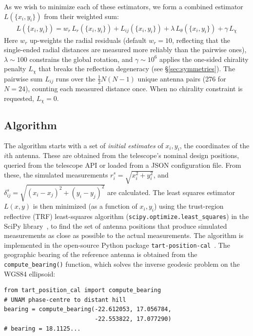 \documentclass[twocolumn, a4paper,10pt]{article}
\begin{document}
As we wish to minimize each of these estimators, we form a combined estimator $L(\{x_i, y_i\})$ from their weighted sum:
\begin{align}
	L(\{x_i, y_i\}) = w_r\, L_r(\{x_i, y_i\}) + L_{ij}(\{x_i, y_i\}) + \lambda\, L_\theta(\{x_i, y_i\}) + \gamma\, L_\chi
	\label{eq:combined}
\end{align}
Here $w_r$ up-weights the radial residuals (default $w_r = 10$, reflecting that the single-ended radial distances are measured more reliably than the pairwise ones), $\lambda \sim 100$ constrains the global rotation, and $\gamma \sim 10^6$ applies the one-sided chirality penalty $L_\chi$ that breaks the reflection degeneracy (see \S\ref{sec:symmetries}). The pairwise sum $L_{ij}$ runs over the $\tfrac{1}{2}N(N-1)$ unique antenna pairs (276 for $N=24$), counting each measured distance once. When no chirality constraint is requested, $L_\chi = 0$.

\subsection{Algorithm}

The algorithm starts with a set of \emph{initial estimates} of $x_i, y_i$, the coordinates of the $i$th antenna. These are obtained from the telescope's nominal design positions, queried from the telescope API or loaded from a JSON configuration file. From these, the simulated measurements $r^s_i = \sqrt{x_i^2 + y_i^2}$, and $\delta^s_{ij} = \sqrt{(x_i - x_j)^2 + (y_i - y_j)^2}$ are calculated. The least squares estimator $L(x,y)$ is then minimized (as a function of $x_i, y_i$) using the trust-region reflective (TRF) least-squares algorithm (\texttt{scipy.optimize.least\_squares}) in the SciPy library~\cite{scipy}, to find the set of antenna positions that produce simulated measurements as close as possible to the actual measurements. The algorithm is implemented in the open-source Python package \texttt{tart-position-cal}~\cite{moltento2026tartpositioncal}.  The geographic bearing of the reference antenna is obtained from the \texttt{compute\_bearing()} function, which solves the inverse geodesic problem on the WGS84 ellipsoid:

\begin{verbatim}
from tart_position_cal import compute_bearing
# UNAM phase-centre to distant hill
bearing = compute_bearing(-22.612053, 17.056784,
                          -22.553822, 17.077290)
# bearing = 18.1125...
\end{verbatim}
\end{document}
